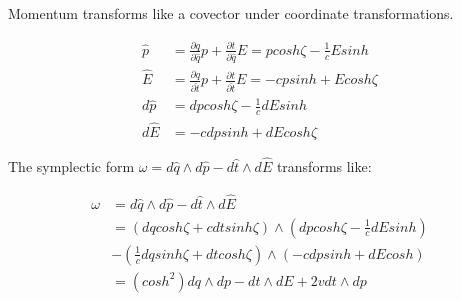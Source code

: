 \documentclass[aps,pra,10pt,twocolumn,floatfix,nofootinbib]{revtex4-1}
\theoremstyle{definition}
\begin{document}
Momentum transforms like a covector under coordinate transformations.

\begin{align*}
\hat{p} &= \frac{\partial q}{\partial \hat{q}} p + \frac{\partial t}{\partial \hat{q}} E = p cosh \zeta - \frac{1}{c} E sinh \\
\hat{E} &= \frac{\partial q}{\partial \hat{t}} p + \frac{\partial t}{\partial \hat{t}} E = - c p sinh + E cosh \zeta \\
d \hat{p} &= dp cosh \zeta - \frac{1}{c} dE sinh \\
d \hat{E} &= - c dp sinh + dE cosh \zeta
\end{align*}

The symplectic form $\omega = d\hat{q} \wedge d\hat{p} - d\hat{t} \wedge d\hat{E}$ transforms like:

\begin{align*}
\omega &= d\hat{q} \wedge d\hat{p} - d\hat{t} \wedge d\hat{E} \\
&= (dq cosh \zeta  + cdt sinh \zeta) \wedge (dp cosh \zeta - \frac{1}{c} dE sinh) \\
&- (\frac{1}{c} dq sinh \zeta + dt cosh \zeta) \wedge (- c dp sinh + dE cosh)\\
&= (cosh^2 ) dq \wedge dp - dt \wedge dE + 2v dt \wedge dp
\end{align*}
\end{document}
